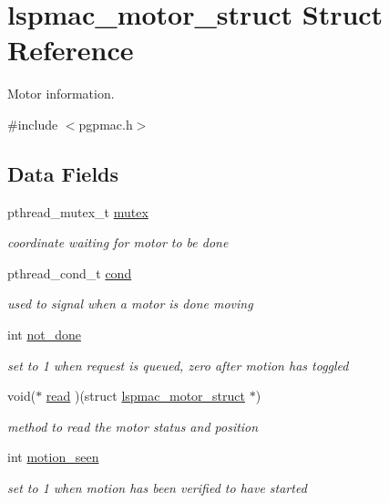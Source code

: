\hypertarget{structlspmac__motor__struct}{\section{lspmac\-\_\-motor\-\_\-struct Struct Reference}
\label{structlspmac__motor__struct}
}


Motor information.  




{\ttfamily \#include $<$pgpmac.\-h$>$}

\subsection*{Data Fields}
\begin{DoxyCompactItemize}
\item 
pthread\-\_\-mutex\-\_\-t \hyperlink{structlspmac__motor__struct_a188c5b1e991750ce2ffd53e0192e0907}{mutex}
\begin{DoxyCompactList}\small\item\em coordinate waiting for motor to be done \end{DoxyCompactList}\item 
pthread\-\_\-cond\-\_\-t \hyperlink{structlspmac__motor__struct_aa0ea4108b8fed5b41ff91ca7266f3d84}{cond}
\begin{DoxyCompactList}\small\item\em used to signal when a motor is done moving \end{DoxyCompactList}\item 
int \hyperlink{structlspmac__motor__struct_ab7bd8bff48953ce05c758598d75877ac}{not\-\_\-done}
\begin{DoxyCompactList}\small\item\em set to 1 when request is queued, zero after motion has toggled \end{DoxyCompactList}\item 
void($\ast$ \hyperlink{structlspmac__motor__struct_ac62692eb939c04ca35e939d1c3acfe8f}{read} )(struct \hyperlink{structlspmac__motor__struct}{lspmac\-\_\-motor\-\_\-struct} $\ast$)
\begin{DoxyCompactList}\small\item\em method to read the motor status and position \end{DoxyCompactList}\item 
int \hyperlink{structlspmac__motor__struct_a68c471836f52707fa8582f7860cf500f}{motion\-\_\-seen}
\begin{DoxyCompactList}\small\item\em set to 1 when motion has been verified to have started \end{DoxyCompactList}\item 

\end{DoxyCompactItemize}
